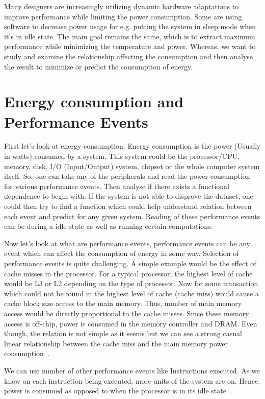 Many designers are increasingly utilizing dynamic hardware adaptations to improve performance while limiting the power consumption. Some are using software to decrease power usage for e.g. putting the system in sleep mode when it's in idle state. The main goal remains the same, which is to extract maximum performance while minimizing the temperature and power. Whereas, we want to study and examine the relationship affecting the consumption and then analyse the result to minimize or predict the consumption of energy.

\section{Energy consumption and Performance Events}

First let's look at energy consumption. Energy consumption is the power (Usually in watts) consumed by a system. This system could be the processor/CPU, memory, disk, I/O (Input/Output) system, chipset or the whole computer system itself. So, one can take any of the peripherals and read the power consumption for various performance events. Then analyse if there exists a functional dependence to begin with. If the system is not able to disprove the dataset, one could then try to find a function which could help understand relation between each event and predict for any given system. Reading of these performance events can be during a idle state as well as running certain computations.

Now let's look at what are performance events, performance events can be any event which can affect the consumption of energy in some way. Selection of performance events is quite challenging. A simple example would be the effect of cache misses in the processor. For a typical processor, the highest level of cache would be L3 or L2 depending on the type of processor. Now for some transaction which could not be found in the highest level of cache (cache miss) would cause a cache block size access to the main memory. Thus, number of main memory access would be directly proportional to the cache misses. Since these memory access is off-chip, power is consumed in the memory controller and DRAM. Even though, the relation is not simple as it seems but we can see a strong casual linear relationship between the cache miss and the main memory power consumption~\cite{bircher2007complete}.

We can use number of other performance events like Instructions executed. As we know on each instruction being executed, more units of the system are on. Hence, power is consumed as opposed to when the processor is in its idle state~\cite{gilberto2005power}.

